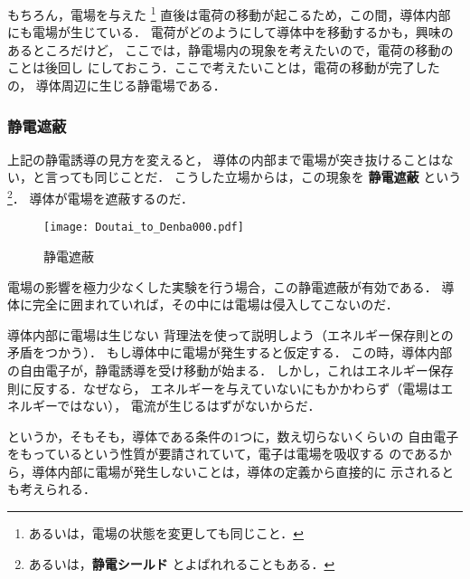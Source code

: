         もちろん，電場を与えた
            \footnote{
                あるいは，電場の状態を変更しても同じこと．
            }
        直後は電荷の移動が起こるため，この間，導体内部にも電場が生じている．
        電荷がどのようにして導体中を移動するかも，興味のあるところだけど，
        ここでは，静電場内の現象を考えたいので，電荷の移動のことは後回し
        にしておこう．ここで考えたいことは，電荷の移動が完了したの，
        導体周辺に生じる静電場である．

        \subsubsection{静電遮蔽}
        上記の静電誘導の見方を変えると，
        導体の内部まで電場が突き抜けることはない，と言っても同じことだ．
        こうした立場からは，この現象を \textbf{静電遮蔽} という
            \footnote{
                あるいは，\textbf{静電シールド} とよばれれることもある．
            }．
        導体が電場を遮蔽するのだ．
                \begin{figure}[hbt]
                    \begin{center}
                        \texttt{[image: Doutai\_to\_Denba000.pdf]}
                        \caption{静電遮蔽}
                        \label{fig:Doutai_to_Denba000}
                    \end{center}
                \end{figure}

        電場の影響を極力少なくした実験を行う場合，この静電遮蔽が有効である．
        導体に完全に囲まれていれば，その中には電場は侵入してこないのだ．

        \begin{memo}{導体内部に電場は生じない}
            背理法を使って説明しよう（エネルギー保存則との矛盾をつかう）．
            もし導体中に電場が発生すると仮定する．
            この時，導体内部の自由電子が，静電誘導を受け移動が始まる．
            しかし，これはエネルギー保存則に反する．なぜなら，
            エネルギーを与えていないにもかかわらず（電場はエネルギーではない），
            電流が生じるはずがないからだ．

            というか，そもそも，導体である条件の1つに，数え切らないくらいの
            自由電子をもっているという性質が要請されていて，電子は電場を吸収する
            のであるから，導体内部に電場が発生しないことは，導体の定義から直接的に
            示されるとも考えられる．
        \end{memo}


